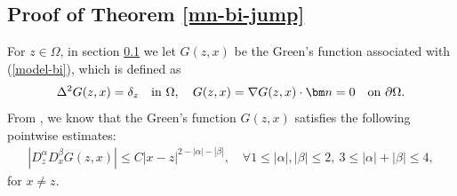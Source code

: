 \documentclass[1996/10/24]{amsart}
\theoremstyle{definition}
\numberwithin{equation}{section}
\begin{document}
\subsection{Proof of Theorem \ref{mn-bi-jump}}\label{sec4:3}
For $z\in\Omega$, in section \ref{sec4:3} we let $G(z,x)$ be the Green's function associated with (\ref{model-bi}), which is defined as
\begin{align*}
\Delta^2G(z,x)=\delta_z\quad {\rm in}~\Omega,\quad G(z,x)=\nabla G(z,x)\cdot{\bm n}=0\quad {\rm on}~\partial\Omega.
\end{align*}
From \cite[Lemma 2.1]{l2021}, we know that the Green's function $G(z,x)$ satisfies the following pointwise estimates:
\begin{align}
|D_z^{\alpha}D_x^{\beta}G(z,x)|\leq C|x-z|^{2-|\alpha|-|\beta|},\quad \forall 1\leq |\alpha|,|\beta|\leq 2,~3\leq |\alpha|+|\beta|\leq 4,\label{pe-G-bi}
\end{align}
for $x\neq z$.
\end{document}
